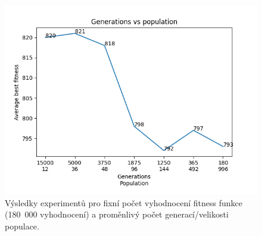 \documentclass[12pt]{article}
\begin{document}
\begin{figure}
    \centering
    \includegraphics[width=0.6\paperwidth]{generations.png}
    \caption{Výsledky experimentů pro fixní počet vyhodnocení fitness funkce (180~000 vyhodnocení) a proměnlivý počet generací/velikosti populace.}
    \label{gen}
\end{figure}
\end{document}

